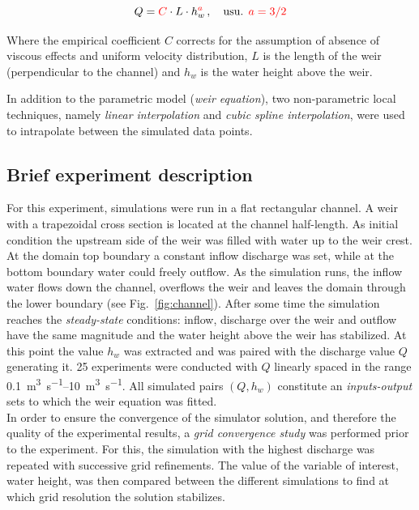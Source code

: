 \begin{equation}\label{eq:weir_eq}
  Q = \textcolor{red}{C} \cdot L \cdot h_w^{\textcolor{red}{a}}\, , \quad \mbox{usu. } \textcolor{red}{a = 3/2}
\end{equation}

\noindent Where the empirical coefficient $C$ corrects for the assumption of absence of viscous effects and uniform velocity distribution, $L$ is the length of the weir (perpendicular to the channel) and $h_w$ is the water height above the weir.

In addition to the parametric model (\textit{weir equation}), two non-parametric local techniques, namely \emph{linear interpolation} and \emph{cubic spline interpolation}, were used to intrapolate between the simulated data points.\\


\subsection{Brief experiment description}\label{sec:cs1_brief_description}

For this experiment, simulations were run in a flat rectangular channel.
A weir with a trapezoidal cross section is located at the channel half-length.
As initial condition the upstream side of the weir was filled with water up to the weir crest.
At the domain top boundary a constant inflow discharge was set, while at the bottom boundary water could freely outflow.
As the simulation runs, the inflow water flows down the channel, overflows the weir and leaves the domain through the lower boundary (see Fig.~\ref{fig:channel}).
After some time the simulation reaches the \emph{steady-state} conditions: inflow, discharge over the weir and outflow have the same magnitude and the water height above the weir has stabilized.
At this point the value $h_w$ was extracted and was paired with the discharge value $Q$ generating it.
\num{25} experiments were conducted with $Q$ linearly spaced in the range \SIrange{0.1}{10}{\cubic\meter\per\second}.
All simulated pairs $(Q, h_w)$ constitute an \emph{inputs-output} sets to which the weir equation was fitted.\\

In order to ensure the convergence of the simulator solution, and therefore the quality of the experimental results, a \emph{grid convergence study} was performed prior to the experiment.
For this, the simulation with the highest discharge was repeated with successive grid refinements.
The value of the variable of interest, water height, was then compared between the different simulations to find at which grid resolution the solution stabilizes.


